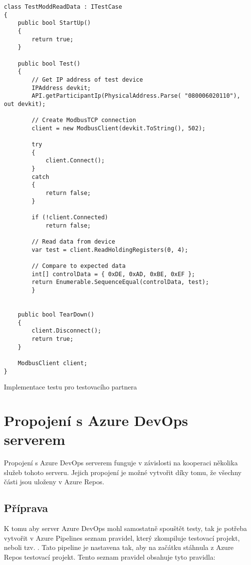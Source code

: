 \begin{listing}[htbp]
    \centering
    \begin{verbatim}
class TestModdReadData : ITestCase
{
    public bool StartUp()
    {
        return true;
    }

    public bool Test()
    {
        // Get IP address of test device
        IPAddress devkit;
        API.getParticipantIp(PhysicalAddress.Parse( "080006020110"), out devkit);

        // Create ModbusTCP connection
        client = new ModbusClient(devkit.ToString(), 502);

        try 
        {
            client.Connect();
        }
        catch 
        {
            return false;
        }

        if (!client.Connected)
            return false;

        // Read data from device
        var test = client.ReadHoldingRegisters(0, 4);
            
        // Compare to expected data
        int[] controlData = { 0xDE, 0xAD, 0xBE, 0xEF };
        return Enumerable.SequenceEqual(controlData, test);
        }


    public bool TearDown()
    {
        client.Disconnect();
        return true;
    }

    ModbusClient client;
}
    \end{verbatim}
\caption{Implementace testu pro testovacího partnera}
\label{listing:testcase_partner}
\end{listing}


\section{Propojení s Azure DevOps serverem}
Propojení s Azure DevOps serverem funguje v závislosti na kooperaci několika služeb tohoto serveru. Jejich propojení je možné vytvořit díky tomu, že všechny části jsou uloženy v Azure Repos. 

\subsection{Příprava}
K tomu aby server Azure DevOps mohl samostatně spouštět testy, tak je potřeba vytvořit v Azure Pipelines seznam pravidel, který zkompiluje testovací projekt, neboli tzv. . Tato pipeline je nastavena tak, aby na začátku stáhnula z Azure Repos testovací projekt. Tento seznam pravidel obsahuje tyto pravidla:

